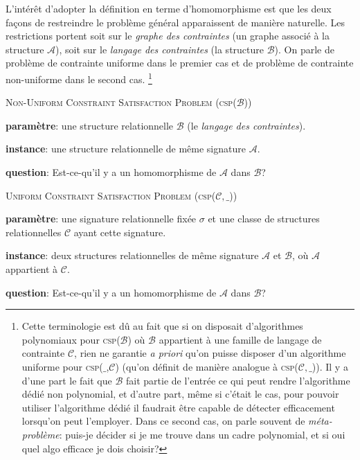 \documentclass[a4paper,12pt]{article}
\theoremstyle{definition}
\theoremstyle{remark}
\begin{document}
L'intérêt d'adopter la définition en terme d'homomorphisme est que les
deux façons de restreindre le problème général apparaissent de manière
naturelle. Les restrictions portent soit sur le \emph{graphe des
contraintes} (un graphe associé à la structure $\mathcal{A}$), soit sur le \emph{langage
des contraintes} (la structure $\mathcal{B}$). On parle de problème de contrainte uniforme dans le premier cas et de problème de contrainte non-uniforme dans le second cas. \footnote{Cette terminologie est dû au fait que si on disposait d'algorithmes polynomiaux pour \textsc{csp($\mathcal{B}$)} où $\mathcal{B}$ appartient à une famille de langage de contrainte $\mathscr{C}$, rien ne garantie \textsl{a priori} qu'on puisse disposer d'un algorithme uniforme pour \textsc{csp($\_$,$\mathscr{C}$)} (qu'on définit de manière analogue à \textsc{csp($\mathscr{C},\_$)}). Il y a d'une part le fait que $\mathcal{B}$ fait partie de l'entrée ce qui peut rendre l'algorithme dédié non polynomial, et d'autre part, même si c'était le cas, pour pouvoir utiliser l'algorithme dédié il faudrait être capable de détecter efficacement lorsqu'on peut l'employer. Dans ce second cas, on parle souvent de \emph{méta-problème}: puis-je décider si je me trouve dans un cadre polynomial, et si oui quel algo efficace je dois choisir?}

\begin{framed}\textsc{Non-Uniform Constraint Satisfaction Problem (csp($\mathcal{B}$))} 
  \begin{compactitem}
  \item \textbf{paramètre}: une structure relationnelle $\mathcal{B}$ (le \emph{langage des contraintes}).
  \item \textbf{instance}: une structure relationnelle de même signature  $\mathcal{A}$.
  \item \textbf{question}: Est-ce-qu'il y a un homomorphisme de $\mathcal{A}$ dans $\mathcal{B}$?
  \end{compactitem}
\end{framed}

\begin{framed}\textsc{Uniform Constraint Satisfaction Problem (csp($\mathscr{C},\_$))} 
  \begin{compactitem}
  \item \textbf{paramètre}: une signature relationnelle fixée  $\sigma$ et une classe de structures relationnelles $\mathscr{C}$ ayant cette signature.
  \item \textbf{instance}: deux structures relationnelles de même signature $\mathcal{A}$ et $\mathcal{B}$, où $\mathcal{A}$ appartient à $\mathscr{C}$.
  \item \textbf{question}: Est-ce-qu'il y a un homomorphisme de $\mathcal{A}$ dans $\mathcal{B}$?
  \end{compactitem}
\end{framed}
\end{document}
